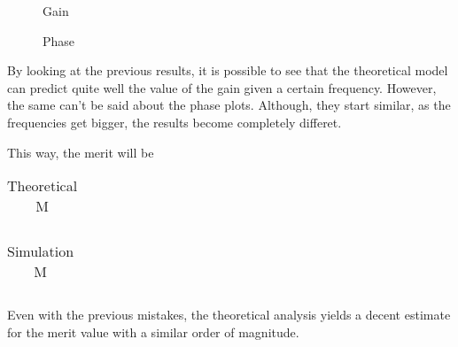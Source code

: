   \begin{figure}[h]
     \centering
     \caption{Gain}
     \label{gain}
 \end{figure}
 
\vspace{0.5cm}
 

\begin{figure}[H]
    \centering
{}
  \hfill
{}
\end{figure}

  \begin{figure}[h]
     \centering
     \caption{Phase}
     \label{phase}
 \end{figure}
 
 
 \vspace{1cm}

By looking at the previous results, it is possible to see that the theoretical model can predict quite well the value of the gain given a certain frequency. However, the same can't be said about the phase plots. Although, they start similar, as the frequencies get bigger, the results become completely differet.

This way, the merit will be

\begin{table}[H]
  \centering
  \begin{tabular}{|l|r|}
    \hline    
    
  \end{tabular}
  \caption{Theoretical M}
  \label{tab:M_T}
\end{table}

\begin{table}[H]
  \centering
  \begin{tabular}{|l|r|}
    \hline    
    
  \end{tabular}
  \caption{Simulation M}
  \label{tab:M_S}
\end{table}

Even with the previous mistakes, the theoretical analysis yields a decent estimate for the merit value with a similar order of magnitude.

